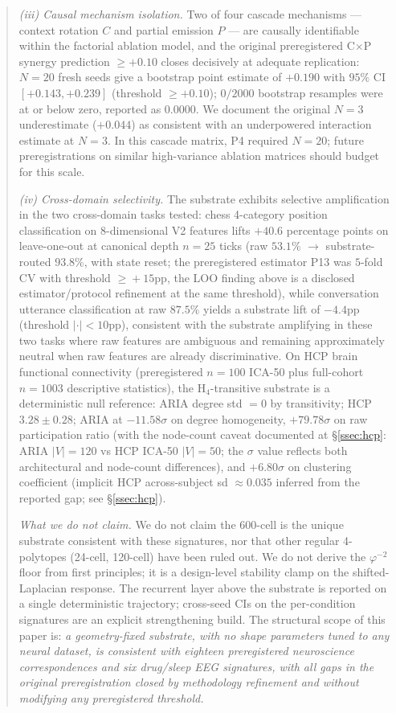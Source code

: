 \documentclass[11pt]{article}
\newcommand{\Ph}{\varphi}
\begin{document}
\begin{abstract}
\noindent\emph{(iii) Causal mechanism isolation.}
Two of four cascade mechanisms — context rotation $C$ and partial
emission $P$ — are causally identifiable within the factorial
ablation model, and the original preregistered C$\times$P synergy
prediction $\geq +0.10$ closes
decisively at adequate replication: $N\!=\!20$ fresh seeds give a
bootstrap point estimate of $+0.190$ with $95\%$ CI $[+0.143, +0.239]$
(threshold $\geq +0.10$); $0/2000$ bootstrap resamples were at or
below zero, reported as $0.0000$. We document the original $N\!=\!3$
underestimate ($+0.044$) as consistent with an underpowered interaction
estimate at $N\!=\!3$. In this cascade matrix, P4 required $N\!=\!20$;
future preregistrations on similar high-variance ablation matrices
should budget for this scale.

\noindent\emph{(iv) Cross-domain selectivity.}
The substrate exhibits selective amplification in the two cross-domain
tasks tested: chess 4-category position classification on
8-dimensional V2 features lifts $+40.6$ percentage points on
leave-one-out at canonical depth $n\!=\!25$ ticks (raw $53.1\%$
$\to$ substrate-routed $93.8\%$, with state reset; the
preregistered estimator P13 was $5$-fold CV with threshold
$\geq\!+15$pp, the LOO finding above is a disclosed estimator/protocol
refinement at the same threshold), while conversation utterance
classification at raw $87.5\%$ yields a substrate lift of $-4.4$pp
(threshold $|\cdot| < 10$pp), consistent with the substrate
amplifying in these two tasks where raw features are ambiguous and
remaining approximately neutral when raw features are already
discriminative. On HCP brain functional connectivity
(preregistered $n\!=\!100$ ICA-50 plus full-cohort $n\!=\!1003$
descriptive statistics), the H$_4$-transitive substrate is a
deterministic null reference: ARIA degree std
$=\!0$ by transitivity; HCP $3.28\!\pm\!0.28$; ARIA at $-11.58\sigma$
on degree homogeneity, $+79.78\sigma$ on raw participation ratio
(with the node-count caveat documented at \S\ref{ssec:hcp}: ARIA
$|V|\!=\!120$ vs HCP ICA-50 $|V|\!=\!50$; the $\sigma$ value reflects
both architectural and node-count differences), and $+6.80\sigma$ on
clustering coefficient (implicit HCP across-subject sd $\approx 0.035$
inferred from the reported gap; see \S\ref{ssec:hcp}).

\noindent\emph{What we do not claim.}
We do not claim the 600-cell is the unique substrate consistent with
these signatures, nor that other regular 4-polytopes (24-cell, 120-cell)
have been ruled out. We do not derive the $\Ph^{-2}$ floor from
first principles; it is a design-level stability clamp on the
shifted-Laplacian response. The recurrent layer above the substrate
is reported on a single deterministic trajectory; cross-seed CIs on
the per-condition signatures are an explicit strengthening build.
The structural scope of this paper is: \emph{a geometry-fixed
substrate, with no shape parameters tuned to any neural dataset,
is consistent with eighteen preregistered neuroscience
correspondences and six drug/sleep EEG signatures, with all gaps in
the original preregistration closed by methodology refinement and
without modifying any preregistered threshold.}
\end{abstract}
\end{document}

